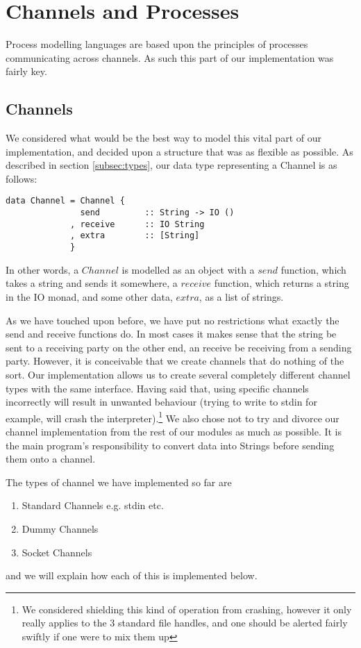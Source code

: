 \section{Channels and Processes}
\label{sec:channels}

Process modelling languages are based upon the principles of processes communicating across channels. As such this part of our implementation was fairly key. 

\subsection{Channels}
We considered what would be the best way to model this vital part of our implementation, and decided upon a structure that was as flexible as possible.
As described in section \ref{subsec:types}, our data type representing a Channel is as follows:

\begin{verbatim}
data Channel = Channel {
               send         :: String -> IO ()
             , receive      :: IO String
             , extra        :: [String]
             }
\end{verbatim}

In other words, a $Channel$ is modelled as an object with a $send$ function, which takes a string and sends it somewhere, a $receive$ function, which returns a string in the IO monad, and some other data, $extra$, as a list of strings.

As we have touched upon before, we have put no restrictions what exactly the send and receive functions do. In most cases it makes sense that the string be sent to a receiving party on the other end, an receive be receiving from a sending party. However, it is conceivable that we create channels that do nothing of the sort. Our implementation allows us to create several completely different channel types with the same interface. Having said that, using specific channels incorrectly
will result in unwanted behaviour (trying to write to stdin for example, will crash the interpreter).\footnote{We considered shielding this kind of operation from crashing, however it only really applies to the 3 standard file handles, and one should be alerted fairly swiftly if one were to mix them up} We also chose not to try and divorce our channel implementation from the rest of our modules as much as possible. It is the main program's responsibility to convert data into Strings
before sending them onto a channel.

The types of channel we have implemented so far are
\begin{enumerate}
    \item Standard Channels e.g. stdin etc.
    \item Dummy Channels
    \item Socket Channels
\end{enumerate}
and we will explain how each of this is implemented below.


